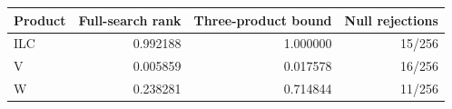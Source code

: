 \begin{tabular}{lrrr}\toprule Product & Full-search rank & Three-product bound & Null rejections\\\midrule
ILC & 0.992188 & 1.000000 & 15/256\\
V & 0.005859 & 0.017578 & 16/256\\
W & 0.238281 & 0.714844 & 11/256\\
\bottomrule\end{tabular}
